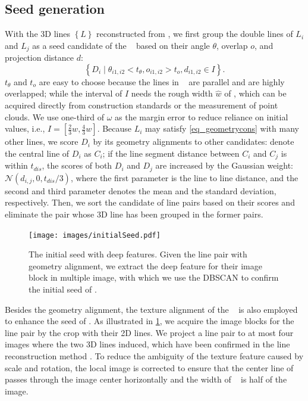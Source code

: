\subsection{Seed generation}
\label{sec_initialseed}
With the 3D lines $\left\{L\right\}$ reconstructed from \citep{WEI2024},
we first group the double lines of $L_i$ and $L_j$ as a seed candidate of the \rlp~  based on their angle $\theta$,
overlap $o$,
and projection distance $d$:
\begin{equation}
   \left\{D_i \mid \theta_{i1,i2} < t_\theta, o_{i1,i2} > t_o, d_{i1,i2} \in I \right\}.
    \label{eq_geometrycons}
\end{equation}
$t_\theta$ and $t_o$ are easy to choose
because the lines in \rlp~ are parallel and are highly overlapped;
while the interval of $I$ needs the rough width $\hat w$ of \rlp,
which can be acquired directly from construction standards or the measurement of point clouds.
We use one-third of $\omega$ as the margin error to reduce reliance on initial values,
i.e., 
$I=[\frac{2}{3}w,\frac{4}{3}w]$.
Because $L_i$ may satisfy \cref{eq_geometrycons} with many other lines,
we score $D_i$ by its geometry alignments to other candidates:
denote the central line of $D_i$ as $C_i$;
if the line segment distance between $C_i$ and $C_j$
is within $t_{dis}$,
the scores of both $D_i$ and $D_j$ are increased by the Gaussian weight:$\mathcal{N}\left(d_{i,j},0, t_{dis}/3\right)$,
where the first parameter is the line to line distance,
and the second and third parameter denotes the mean and the standard deviation,
respectively.
Then,
we sort the candidate of line pairs based on their scores and eliminate the pair whose 3D line has been grouped in the former pairs.

\begin{figure}[h]
    \centering
    \texttt{[image: images/initialSeed.pdf]}
    \caption{The initial seed with deep features.
    Given the line pair with geometry alignment, 
    we extract the deep feature for their image block in multiple image,
    with which we use the DBSCAN to confirm the initial seed of \rlp.}
    \label{fig_initialseed}
\end{figure}

Besides the geometry alignment,
the texture alignment of the \rlp~ is also employed to enhance the seed of \rlp.
As illustrated in \cref{fig_initialseed}, 
we acquire the image blocks for the line pair by the crop with their 2D lines.   
We project a line pair to at most four images where the two 3D lines induced,
which have been confirmed in the line reconstruction method \citep{WEI2024}.
To reduce the ambiguity of the texture feature caused by scale and rotation,
the local image is corrected to ensure that the center line of \rlp~ passes through the image center horizontally and the width of \rlp~ is half of the image.

